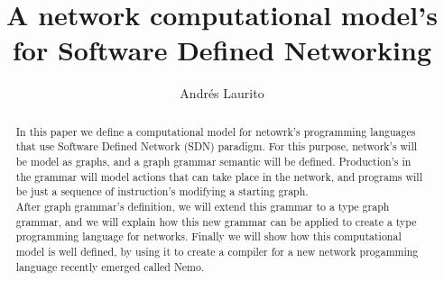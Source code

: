 \documentclass[envcountsect,runningheads]{llncs}
\title{A network computational model's for Software Defined Networking}
\author{Andr\'es Laurito}
\institute{
Departamento de Computac\'on - FCEN -UBA\\
 \email{andy.laurito@gmail.com} }
\begin{document}
\maketitle

\begin{abstract}
In this paper we define a computational model for netowrk's programming languages 
that use Software Defined Network (SDN) paradigm. For this purpose, 
network's will be model as graphs, and a graph grammar semantic will be defined. 
Production's in the grammar will model actions that can take place in the network, and programs 
will be just a sequence of instruction's modifying a starting graph. \\
After graph grammar's definition, we will extend this grammar to a type graph grammar, and we 
will explain how this new grammar can be applied to create a type programming language 
for networks. Finally we will show how this computational model is well defined, by using it to 
create a compiler for a new network progamming language recently emerged called Nemo. 
\end{abstract}
\end{document}
